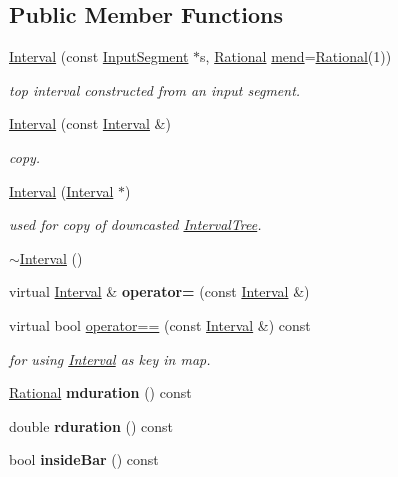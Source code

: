 \subsection*{Public Member Functions}
\begin{DoxyCompactItemize}
\item 
\mbox{\hyperlink{group__segment_gadfaf31fca3f5e5da49e37c7baa275125}{Interval}} (const \mbox{\hyperlink{classInputSegment}{Input\+Segment}} $\ast$s, \mbox{\hyperlink{classRational}{Rational}} \mbox{\hyperlink{classInterval_a963b9b36f085a7db9c159c55608f8408}{mend}}=\mbox{\hyperlink{classRational}{Rational}}(1))
\begin{DoxyCompactList}\small\item\em top interval constructed from an input segment. \end{DoxyCompactList}\item 
\mbox{\hyperlink{group__segment_ga17cfcca410ae94fe906dfcdb726026f5}{Interval}} (const \mbox{\hyperlink{classInterval}{Interval}} \&)
\begin{DoxyCompactList}\small\item\em copy. \end{DoxyCompactList}\item 
\mbox{\hyperlink{group__segment_ga43e7da7f24dfa17fccdd0dd40a96f458}{Interval}} (\mbox{\hyperlink{classInterval}{Interval}} $\ast$)
\begin{DoxyCompactList}\small\item\em used for copy of downcasted \mbox{\hyperlink{classIntervalTree}{Interval\+Tree}}. \end{DoxyCompactList}\item 
\mbox{\hyperlink{classInterval_a923e1717a3dedfe1ba90f81fcb26d5c5}{$\sim$\+Interval}} ()
\item 
virtual \mbox{\hyperlink{classInterval}{Interval}} \& {\bfseries operator=} (const \mbox{\hyperlink{classInterval}{Interval}} \&)
\item 
virtual bool \mbox{\hyperlink{group__segment_ga4b0896bf3843fec18d68a130fe9a49f6}{operator==}} (const \mbox{\hyperlink{classInterval}{Interval}} \&) const
\begin{DoxyCompactList}\small\item\em for using \mbox{\hyperlink{classInterval}{Interval}} as key in map. \end{DoxyCompactList}\item 
\mbox{\label{classInterval_aaed8b0e404390af39c51e657636bf14d}} 
\mbox{\hyperlink{classRational}{Rational}} {\bfseries mduration} () const
\item 
\mbox{\label{classInterval_afbb05608fd0b263d905a29480e921b75}} 
double {\bfseries rduration} () const
\item 
bool {\bfseries inside\+Bar} () const
\end{DoxyCompactItemize}
